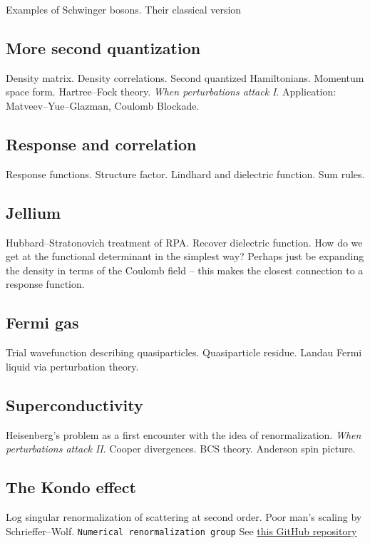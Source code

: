 Examples of Schwinger bosons. Their classical version

\subsection{More second quantization}

Density matrix. Density correlations. Second quantized Hamiltonians. Momentum space form. Hartree--Fock theory. \emph{When perturbations attack I}. Application: Matveev--Yue--Glazman, Coulomb Blockade. 

\subsection{Response and correlation}

Response functions. Structure factor. Lindhard and dielectric function. Sum rules.

\subsection{Jellium}

Hubbard--Stratonovich treatment of RPA. Recover dielectric function. How do we get at the functional determinant in the simplest way? Perhaps just be expanding the density in terms of the Coulomb field -- this makes the closest connection to a response function.

\subsection{Fermi gas}

Trial wavefunction describing quasiparticles. Quasiparticle residue. Landau Fermi liquid via perturbation theory. 

\subsection{Superconductivity}

Heisenberg's problem as a first encounter with the idea of renormalization. \emph{When perturbations attack II}. Cooper divergences. BCS theory. Anderson spin picture.

\subsection{The Kondo effect}

Log singular renormalization of scattering at second order. Poor man's scaling by Schrieffer--Wolf. \verb|Numerical renormalization group| See \href{https://github.com/LucasNogueiraMartins/NRG-Didactic}{this GitHub repository}

